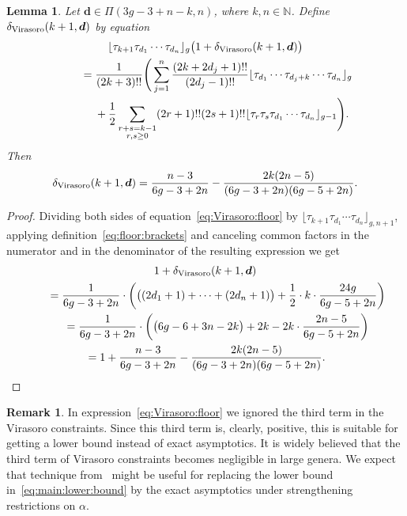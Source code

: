 \documentclass[pdftex]{sigma}
\newcommand\N{\mathbb N}
\newtheorem{Lemma}[Theorem]{Lemma}
\theoremstyle{definition}
\newtheorem{Remark}[Theorem]{Remark}
\begin{document}
\begin{Lemma}\label{lm:Virasoro}
Let $\boldsymbol{d}\in\Pi(3g-3+n-k,n)$, where $k,n\in\N$.
Define $\delta_{\rm Virasoro}(k+1,\boldsymbol{d})$
by equation
\begin{gather}
\lfloor\tau_{k+1}\tau_{d_1}\cdots\tau_{d_n}\rfloor_g
\big(1+\delta_{\rm Virasoro}(k+1,\boldsymbol{d})\big)
\nonumber\\
\qquad{} =\frac{1}{(2k+3)!!}
\Bigg(\sum_{j=1}^n
\frac{(2k+2d_j+1)!!}{(2d_j-1)!!}\lfloor\tau_{d_1}\cdots
\tau_{d_{j}+k}\cdots\tau_{d_n}\rfloor_g\nonumber\\
\qquad\quad{} +\frac{1}{2}\sum_{\substack{r+s=k-1\\r,s\ge 0}}
(2r+1)!!(2s+1)!!\lfloor\tau_r\tau_s\tau_{d_1}\cdots\tau_{d_n}\rfloor_{g-1}\Bigg) .\label{eq:Virasoro:floor}
\end{gather}
Then
\begin{gather}\label{eq:delta:Virasoro}
\delta_{\rm Virasoro}(k+1,\boldsymbol{d})
=\frac{n-3}{6g-3+2n}-\frac{2k(2n-5)}{(6g-3+2n)(6g-5+2n)} .
\end{gather}
\end{Lemma}

\begin{proof}Dividing both sides of equation~\eqref{eq:Virasoro:floor} by
$\lfloor \tau_{k+1}\tau_{d_1} \cdots \tau_{d_n}\rfloor_{g,n+1}$,
applying definition~\eqref{eq:floor:brackets}
and canceling common factors in the numerator and in the denominator
of the resulting expression we get
\begin{gather*}
1+\delta_{\rm Virasoro}(k+1,\boldsymbol{d})\\
\qquad{} =
\frac{1}{6g-3+2n}\cdot\left(
\big((2d_1+1)+\dots+(2d_n+1)\big)
+\frac{1}{2}\cdot k\cdot \frac{24g}{6g-5+2n}\right) \\
 \qquad{} =\frac{1}{6g-3+2n}\cdot\left(
\big(6g-6+3n-2k\big)+2k-2k\cdot\frac{2n-5}{6g-5+2n}\right)\\
\qquad{} = 1+\frac{n-3}{6g-3+2n}-\frac{2k(2n-5)}{(6g-3+2n)(6g-5+2n)} .\tag*{\qed}
\end{gather*}\renewcommand{\qed}{}
\end{proof}

\begin{Remark}\label{rm:lower:bound:Virasoro}
In expression~\eqref{eq:Virasoro:floor} we ignored the third term in the Virasoro constraints. Since this third term is, clearly, positive,
this is suitable for getting a lower bound
instead of exact asymptotics.
It is widely believed that the third term
of Virasoro constraints becomes negligible in large genera. We expect that technique from~\cite{Aggarwal:Siegel:Veech} might be useful for replacing
the lower bound in~\eqref{eq:main:lower:bound} by the exact asymptotics
under strengthening restrictions on $\alpha$.
\end{Remark}
\end{document}
